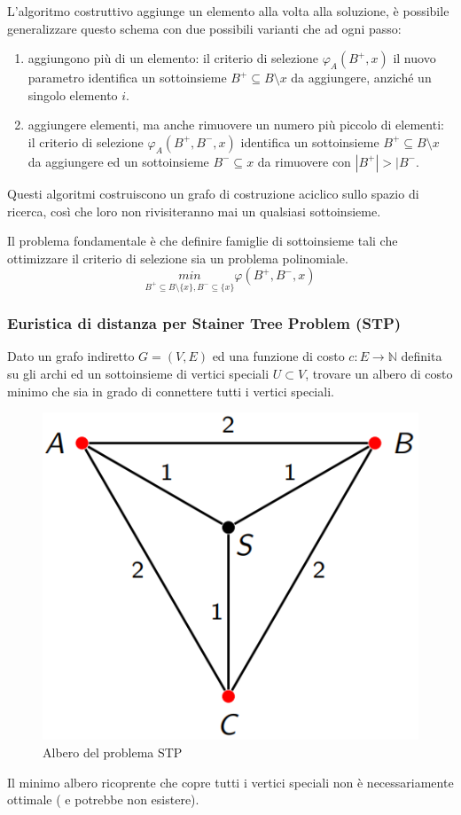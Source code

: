 \documentclass{article}
\begin{document}
    L'algoritmo costruttivo aggiunge un elemento alla volta alla soluzione, è possibile
    generalizzare questo schema con due possibili varianti che ad ogni passo:
    \begin{enumerate}
        \item aggiungono più di un elemento: il criterio di selezione $\varphi_A(B^+,x)$
              il nuovo parametro identifica un sottoinsieme $B^+\subseteq B\setminus x$ da aggiungere, anziché un singolo elemento $i$.

        \item aggiungere elementi, ma anche rimuovere un numero più piccolo di elementi: il
              criterio di selezione $\varphi_A(B^+,B^-,x)$ identifica un sottoinsieme $B^+\subseteq B\setminus x$
              da aggiungere ed un sottoinsieme $B^-\subseteq x$ da rimuovere con $|B^+|>|B^-$.
    \end{enumerate}

    Questi algoritmi costruiscono un grafo di costruzione aciclico sullo spazio di ricerca, così
    che loro non rivisiteranno mai un qualsiasi sottoinsieme.

    Il problema fondamentale è che definire famiglie di sottoinsieme tali che ottimizzare il criterio
    di selezione sia un problema polinomiale.
    $$\underset{B^+\subseteq B\setminus \{x\}, B^- \subseteq \{x\}}{min}\varphi(B^+, B^-,x)$$

    \subsubsection{Euristica di distanza per Stainer Tree Problem (STP)}
    Dato un grafo indiretto $G=(V,E)$ ed una funzione di costo $c:E\rightarrow\mathbb{N}$ definita
    su gli archi ed un sottoinsieme di vertici speciali $U\subset V$, trovare un albero
    di costo minimo che sia in grado di connettere tutti i vertici speciali.

    \begin{figure}[H]
        \centering
        \includegraphics[scale=0.5]{images/stp.png}
        \caption{Albero del problema STP}
    \end{figure}
    Il minimo albero ricoprente che copre tutti i vertici speciali non è necessariamente ottimale (
    e potrebbe non esistere).
\end{document}
